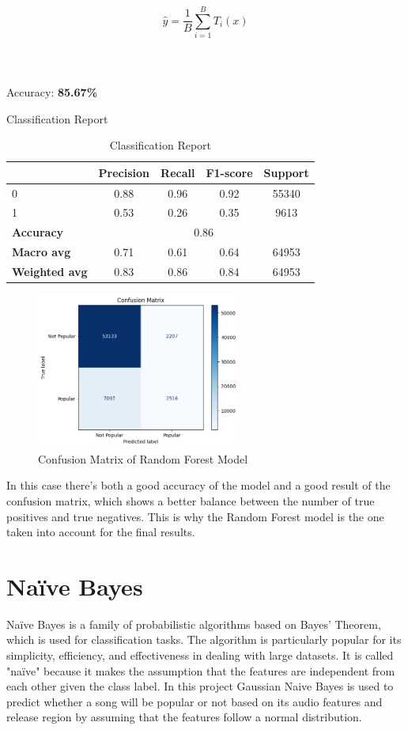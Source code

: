 \[
\hat{y} = \frac{1}{B} \sum_{i=1}^{B} T_i(x)
\]
\\
\\
\\
Accuracy: \textbf{85.67\%}

\newpage
Classification Report
\begin{table}[h]
    \centering
    \begin{tabular}{lcccc}
        \toprule
        & \textbf{Precision} & \textbf{Recall} & \textbf{F1-score} & \textbf{Support} \\
        \midrule
        0 & 0.88 & 0.96 & 0.92 & 55340 \\
        1 & 0.53 & 0.26 & 0.35 & 9613 \\
        \midrule
        \textbf{Accuracy} & \multicolumn{4}{c}{0.86} \\
        \textbf{Macro avg} & 0.71 & 0.61 & 0.64 & 64953 \\
        \textbf{Weighted avg} & 0.83 & 0.86 & 0.84 & 64953 \\
        \bottomrule
    \end{tabular}
    \caption{Classification Report}
    \label{tab:classification_report}
\end{table}

\begin{figure}[h] 
    \centering 
    \includegraphics[width=0.6\textwidth]{media/random_forest_conf_matrix.png}
    \caption{Confusion Matrix of Random Forest Model}

\end{figure}

In this case there's both a good accuracy of the model and a good result of the confusion matrix, which shows a better balance between the number of true positives and true negatives. This is why the Random Forest model is the one taken into account for the final results.

\section{Naïve Bayes}
Naïve Bayes is a family of probabilistic algorithms based on Bayes' Theorem, which is used for classification tasks.
The algorithm is particularly popular for its simplicity, efficiency, and effectiveness in dealing with large datasets.
It is called "naïve" because it makes the assumption that the features are independent from each other given the class label.
In this project Gaussian Naive Bayes is used to predict whether a song will be popular or not based on its audio features and release region by assuming that
the features follow a normal distribution. 

